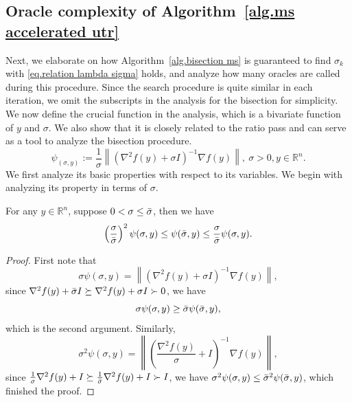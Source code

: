 \documentclass{mcom-l}
\numberwithin{equation}{section}
\begin{document}
\subsection{Oracle complexity of Algorithm~\ref{alg.ms accelerated utr}}
Next, we elaborate on how Algorithm~\ref{alg.bisection ms} is guaranteed to find $\sigma_k$ with \eqref{eq.relation lambda sigma} holds, and analyze how many oracles are called during this procedure. Since the search procedure is quite similar in each iteration, we omit the subscripts in the analysis for the bisection for simplicity. We now define the crucial function in the analysis, which is a bivariate function of $y$ and $\sigma$. We also show that it is closely related to the ratio pass and can serve as a tool to analyze the bisection procedure.
\begin{equation}
    \label{eq.linesearch quantity}
    \psi_(\sigma,y) := \frac{1}{\sigma}\left \| \left(\nabla^2 f(y)+\sigma I \right)^{-1}\nabla f(y)\right \|, \ \sigma>0, y\in\mathbb{R}^n.
\end{equation}
We first analyze its basic properties with respect to its variables. We begin with analyzing its property in terms of $\sigma$.
\begin{lemma}
    \label{lem.psi property wrt sigma}
    For any $y\in\mathbb{R}^n$, suppose $0<\sigma\leq \Bar{\sigma}$, then we have
    \begin{equation}
        \label{eq.psi property wrt sigma}
        \left(\frac{\sigma}{\Bar{\sigma}}\right)^2 \psi(\sigma,y)\leq \psi(\Bar{\sigma},y) \leq \frac{\sigma}{\Bar{\sigma}}\psi(\sigma,y).
    \end{equation}
\end{lemma}
\begin{proof}
    First note that
    \begin{equation*}
        \sigma \psi(\sigma,y) = \left \| \left(\nabla^2 f(y)+\sigma I \right)^{-1}\nabla f(y)\right \|,
    \end{equation*}
    since $\nabla^2 f(y)+\Bar{\sigma} I\succeq \nabla^2 f(y)+\sigma I \succ 0$, we have
    \begin{equation*}
        \sigma \psi(\sigma,y) \geq \Bar{\sigma} \psi(\Bar{\sigma},y),
    \end{equation*}
    which is the second argument. Similarly,
    \begin{equation*}
        \sigma^2 \psi(\sigma,y) = \left \| \left(\frac{\nabla^2 f(y)}{\sigma}+ I \right)^{-1}\nabla f(y)\right \|,
    \end{equation*}
    since $\frac{1}{\sigma}\nabla^2 f(y)+I\succeq \frac{1}{\Bar{\sigma}}\nabla^2 f(y)+I\succ I$, we have $\sigma^2 \psi(\sigma,y)\leq \Bar{\sigma}^2 \psi(\Bar{\sigma},y)$, which finished the proof.
\end{proof}
\end{document}

